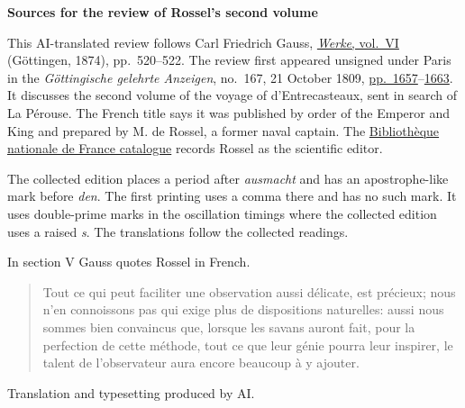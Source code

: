 \clearpage\thispagestyle{empty}
\begin{center}\textbf{Sources for the review of Rossel’s second volume}\end{center}
\noindent This AI-translated review follows Carl Friedrich Gauss, \href{https://gdz.sub.uni-goettingen.de/id/PPN236007467}{\emph{Werke}, vol.~VI} (Göttingen, 1874), pp.~520–522. The review first appeared unsigned under Paris in the \emph{Göttingische gelehrte Anzeigen}, no.~167, 21 October 1809, \href{https://images.p.sub.uni-goettingen.de/iiif/image/gdz:PPN319721507_1809:00001661/full/1650,/0/default.jpg}{pp.~1657}–\href{https://images.p.sub.uni-goettingen.de/iiif/image/gdz:PPN319721507_1809:00001667/full/1650,/0/default.jpg}{1663}. It discusses the second volume of the voyage of d’Entrecasteaux, sent in search of La Pérouse. The French title says it was published by order of the Emperor and King and prepared by M. de Rossel, a former naval captain. The \href{https://catalogue.bnf.fr/ark:/12148/cb43383186m}{Bibliothèque nationale de France catalogue} records Rossel as the scientific editor.
\par\smallskip\noindent The collected edition places a period after \emph{ausmacht} and has an apostrophe-like mark before \emph{den}. The first printing uses a comma there and has no such mark. It uses double-prime marks in the oscillation timings where the collected edition uses a raised \emph{s}. The translations follow the collected readings.
\par\smallskip\noindent In section V Gauss quotes Rossel in French.
\begin{quote}
Tout ce qui peut faciliter une observation aussi délicate, est précieux; nous n'en connoissons pas qui exige plus de dispositions naturelles: aussi nous sommes bien convaincus que, lorsque les savans auront fait, pour la perfection de cette méthode, tout ce que leur génie pourra leur inspirer, le talent de l'observateur aura encore beaucoup à y ajouter.
\end{quote}
\noindent Translation and typesetting produced by AI.
\clearpage

